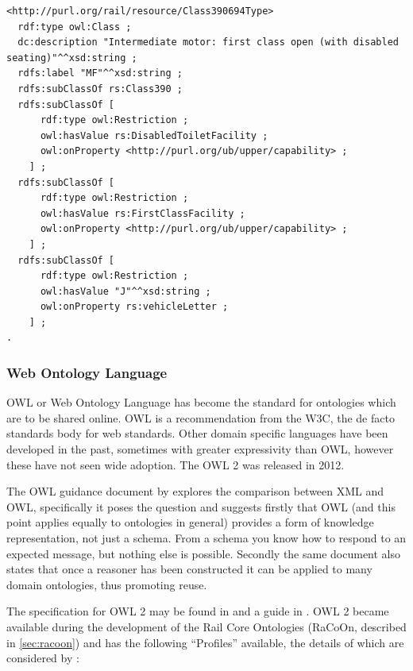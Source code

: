 \begin{lstlisting}[label={lst:turtleExample}, caption={A specific car forming part of a Class 390, represented in turtle},language={turtle},frame=tb]
<http://purl.org/rail/resource/Class390694Type>
  rdf:type owl:Class ;
  dc:description "Intermediate motor: first class open (with disabled seating)"^^xsd:string ;
  rdfs:label "MF"^^xsd:string ;
  rdfs:subClassOf rs:Class390 ;
  rdfs:subClassOf [
      rdf:type owl:Restriction ;
      owl:hasValue rs:DisabledToiletFacility ;
      owl:onProperty <http://purl.org/ub/upper/capability> ;
    ] ;
  rdfs:subClassOf [
      rdf:type owl:Restriction ;
      owl:hasValue rs:FirstClassFacility ;
      owl:onProperty <http://purl.org/ub/upper/capability> ;
    ] ;
  rdfs:subClassOf [
      rdf:type owl:Restriction ;
      owl:hasValue "J"^^xsd:string ;
      owl:onProperty rs:vehicleLetter ;
    ] ;
.
\end{lstlisting}


\subsubsection{Web Ontology Language}\label{sec:OWL}
OWL or Web Ontology Language has become the standard for ontologies which are to be shared online. OWL is a recommendation from the W3C, the de facto standards body for web standards. Other domain specific languages have been developed in the past, sometimes with greater expressivity than OWL, however these have not seen wide adoption. The OWL 2 was released in 2012.

The OWL guidance document by \citet{McGuinness04} explores the comparison between XML and OWL, specifically it poses the question  and suggests firstly that OWL (and this point applies equally to ontologies in general) provides a form of knowledge representation, not just a schema. From a schema you know how to respond to an expected message, but nothing else is possible. Secondly the same document also states that once a reasoner has been constructed it can be applied to many domain ontologies, thus promoting reuse.

The specification for OWL 2 may be found in \cite{Parsia:09:OWO} and a guide in \citet{Parsia12}. OWL 2 became available during the development of the Rail Core Ontologies (RaCoOn, described in \autoref{sec:racoon}) and has the following ``Profiles'' available, the details of which are considered by \citet{Parsia12}:

